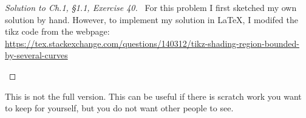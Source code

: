 \documentclass[12pt]{amsart}
\numberwithin{equation}{section}
\theoremstyle{definition}
\theoremstyle{remark}
\newif\ifnotes
\begin{document}
\begin{proof}[Solution to Ch.1, \S 1.1,  Exercise 40]
\ 
For this problem I first sketched my own solution by hand.  However, to implement my solution in \LaTeX, I  modifed the tikz code from the webpage: 
\\ 
\url{https://tex.stackexchange.com/questions/140312/tikz-shading-region-bounded-by-several-curves}
\begin{center}
\end{center}

\end{proof}





\ifnotes


\else
	This is not the full version.  This can be useful if there is scratch work you want to keep for yourself, but you do not want other people to see. 
\fi





\end{document}
